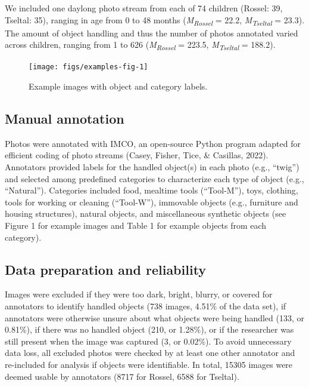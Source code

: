 \documentclass[10pt, letterpaper]{article}
\newenvironment{CodeChunk}{}{}
\begin{document}
We included one daylong photo stream from each of 74 children (Rossel:
39, Tseltal: 35), ranging in age from 0 to 48 months
(\emph{M}\textsubscript{\emph{Rossel}} = 22.2,
\emph{M}\textsubscript{\emph{Tseltal}} = 23.3). The amount of object
handling and thus the number of photos annotated varied across children,
ranging from 1 to 626 (\emph{M}\textsubscript{\emph{Rossel}} = 223.5,
\emph{M}\textsubscript{\emph{Tseltal}} = 188.2).

\begin{CodeChunk}
\begin{figure}[h]

{\centering \texttt{[image: figs/examples-fig-1]} 

}

\caption[Example images with object and category labels]{Example images with object and category labels.}\label{fig:examples-fig}
\end{figure}
\end{CodeChunk}

\hypertarget{manual-annotation}{%
\subsection{Manual annotation}\label{manual-annotation}}

Photos were annotated with IMCO, an open-source Python program adapted
for efficient coding of photo streams (Casey, Fisher, Tice, \& Casillas,
2022). Annotators provided labels for the handled object(s) in each
photo (e.g., ``twig'') and selected among predefined categories to
characterize each type of object (e.g., ``Natural''). Categories
included food, mealtime tools (``Tool-M''), toys, clothing, tools for
working or cleaning (``Tool-W''), immovable objects (e.g., furniture and
housing structures), natural objects, and miscellaneous synthetic
objects (see Figure 1 for example images and Table 1 for example objects
from each category).

\hypertarget{data-preparation-and-reliability}{%
\subsection{Data preparation and
reliability}\label{data-preparation-and-reliability}}

Images were excluded if they were too dark, bright, blurry, or covered
for annotators to identify handled objects (738 images, 4.51\% of the
data set), if annotators were otherwise unsure about what objects were
being handled (133, or 0.81\%), if there was no handled object (210, or
1.28\%), or if the researcher was still present when the image was
captured (3, or 0.02\%). To avoid unnecessary data loss, all excluded
photos were checked by at least one other annotator and re-included for
analysis if objects were identifiable. In total, 15305 images were
deemed usable by annotators (8717 for Rossel, 6588 for Tseltal).
\end{document}
